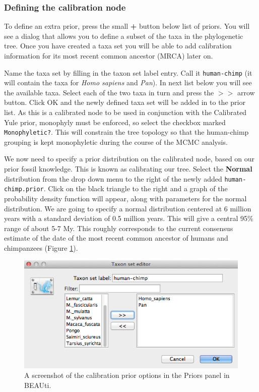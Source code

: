 \documentclass[11pt]{article}
\theoremstyle{plain}%
\theoremstyle{definition}
\theoremstyle{remark}
\begin{document}

\subsubsection{Defining the calibration node}

To define an extra prior, press the small {\bf +} button below list of priors. You will see a
dialog that allows you to define a subset of the taxa in the phylogenetic tree. Once you have created a taxa set you will be able to add calibration information for its most recent common
ancestor (MRCA) later on. 

Name the taxa set by filling in the taxon set label entry. 
Call it \texttt{human-chimp} (it will contain the taxa for {\it Homo sapiens} and {\it Pan}).
In next list below you will see the available taxa. Select each of the two taxa in turn and press the $> >$ arrow button. 
Click OK and the newly defined taxa set will be added in to the prior list.
As this is a calibrated node to be used in conjunction with the Calibrated Yule prior, monophyly must be enforced, so select the checkbox marked \texttt{Monophyletic?}. This will constrain the tree topology so that the human-chimp grouping is kept monophyletic during the course of the MCMC analysis.

We now need to specify a prior distribution on the calibrated node, based on our prior fossil knowledge. This is known
as calibrating our tree. Select the \textbf{Normal} distribution from the drop down menu to the right of the newly added \texttt{human-chimp.prior}. Click on the black triangle to the right and
a graph of the probability density function will appear, along with parameters for the normal distribution.
We are going to specify a normal distribution centered at 6 million
years with a standard deviation of 0.5 million years. This will give
a central 95\% range of about 5-7 My. This roughly corresponds to the current consensus
estimate of the date of the most recent common ancestor of humans and chimpanzees (Figure \ref{fig:BEAUti_TaxonSets}).

\begin{figure}
\includegraphics[width=\textwidth]{figures/BEAUti_TaxonSets}
\caption{A screenshot of the calibration prior options in the Priors panel in BEAUti.}
\label{fig:BEAUti_TaxonSets}
\end{figure}
\end{document}
